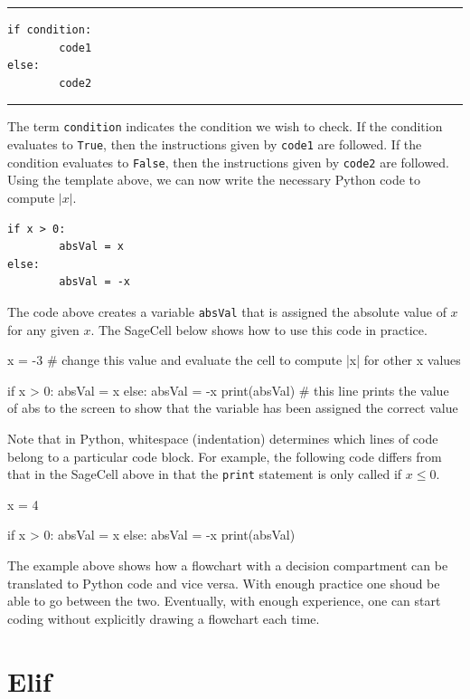 \documentclass{ximera}
\begin{document}
\noindent\rule{\textwidth}{1pt}
\begin{verbatim}
if condition:
        code1
else:
        code2
\end{verbatim}
\noindent\rule{\textwidth}{1pt}

The term \verb|condition| indicates the condition we wish to check. If the condition evaluates to \verb|True|, then the instructions given by \verb|code1| are followed. If the condition evaluates to \verb|False|, then the instructions given by \verb|code2| are followed. Using the template above, we can now write the necessary Python code to compute $|x|$.

\begin{lstlisting}
if x > 0:
        absVal = x
else:
        absVal = -x
\end{lstlisting}

The code above creates a variable \verb|absVal| that is assigned the absolute value of $x$ for any given $x$. The SageCell below shows how to use this code in practice.

\begin{sageCell}
x = -3               # change this value and evaluate the cell to compute |x| for other x values

if x > 0:
	absVal = x
else:
	absVal = -x
print(absVal)        # this line prints the value of abs to the screen to show that the variable has been assigned the correct value
\end{sageCell}

Note that in Python, whitespace (indentation) determines which lines of code belong to a particular code block. For example, the following code differs from that in the SageCell above in that the \verb|print| statement is only called if $x\leq 0$.

\begin{sageCell}
x = 4

if x > 0:
	absVal = x
else:
	absVal = -x
	print(absVal)
\end{sageCell}

The example above shows how a flowchart with a decision compartment can be translated to Python code and vice versa. With enough practice one shoud be able to go between the two. Eventually, with enough experience, one can start coding without explicitly drawing a flowchart each time.

\section{Elif}
\end{document}
